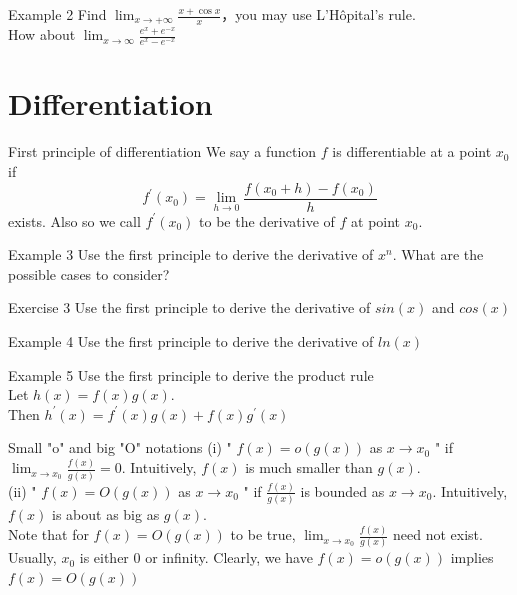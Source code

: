 \documentclass{beamer}
\begin{document}
\begin{frame}{Example 2}
   Find $\lim _{x \rightarrow +\infty} \frac{x+\cos x}{x}$，you may use L'Hôpital's rule.\\
   How about $\lim _{x \rightarrow \infty} \frac{e^x+e^{-x}}{e^x-e^{-x}}$
\end{frame}

\section{Differentiation}
\begin{frame}{First principle of differentiation}
    We say a function $f$ is differentiable at a point $x_0$ if
$$
f^{\prime}\left(x_0\right)=\lim _{h \rightarrow 0} \frac{f\left(x_0+h\right)-f\left(x_0\right)}{h}
$$
exists. Also so we call $f^{\prime}\left(x_0\right)$ to be the derivative of $f$ at point $x_0$.
\end{frame}

\begin{frame}{Example 3}
     Use the first principle to derive the derivative of $x^n$. What are the possible cases to consider?
\end{frame}

\begin{frame}{Exercise 3}
    Use the first principle to derive the derivative of $sin(x)$ and $cos(x)$
\end{frame}

\begin{frame}{Example 4}
    Use the first principle to derive the derivative of $ln(x)$
\end{frame}

\begin{frame}{Example 5}
 Use the first principle to derive the product rule\\
 Let $h(x)=f(x) g(x)$.\\
Then $h^{\prime}(x)=f^{\prime}(x) g(x)+f(x) g^{\prime}(x)$
\end{frame}

\begin{frame}{Small "o" and big "O" notations}
    (i) " $f(x)=o(g(x))$ as $x \rightarrow x_0$ " if $\lim _{x \rightarrow x_0} \frac{f(x)}{g(x)}=0$. Intuitively, $f(x)$ is much smaller than $g(x)$.\\
    (ii) " $f(x)=O(g(x))$ as $x \rightarrow x_0$ " if $\frac{f(x)}{g(x)}$ is bounded as $x \rightarrow x_0$. Intuitively, $f(x)$ is about as big as $g(x)$.\\
    Note that for $f(x)=O(g(x))$ to be true, $\lim _{x \rightarrow x_0} \frac{f(x)}{g(x)}$ need not exist.\\
    Usually, $x_0$ is either 0 or infinity. Clearly, we have $f(x)=o(g(x))$ implies $f(x)=O(g(x))$\\
\end{frame}
\end{document}
